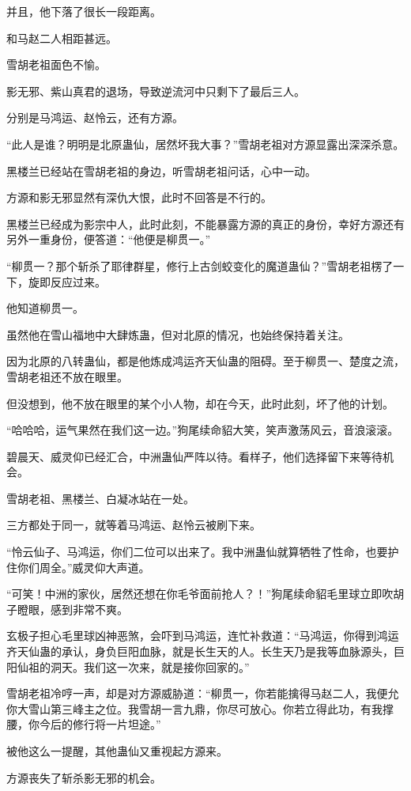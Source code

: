 \begin{this_body}
并且，他下落了很长一段距离。

和马赵二人相距甚远。

雪胡老祖面色不愉。

影无邪、紫山真君的退场，导致逆流河中只剩下了最后三人。

分别是马鸿运、赵怜云，还有方源。

“此人是谁？明明是北原蛊仙，居然坏我大事？”雪胡老祖对方源显露出深深杀意。

黑楼兰已经站在雪胡老祖的身边，听雪胡老祖问话，心中一动。

方源和影无邪显然有深仇大恨，此时不回答是不行的。

黑楼兰已经成为影宗中人，此时此刻，不能暴露方源的真正的身份，幸好方源还有另外一重身份，便答道：“他便是柳贯一。”

“柳贯一？那个斩杀了耶律群星，修行上古剑蛟变化的魔道蛊仙？”雪胡老祖楞了一下，旋即反应过来。

他知道柳贯一。

虽然他在雪山福地中大肆炼蛊，但对北原的情况，也始终保持着关注。

因为北原的八转蛊仙，都是他炼成鸿运齐天仙蛊的阻碍。至于柳贯一、楚度之流，雪胡老祖还不放在眼里。

但没想到，他不放在眼里的某个小人物，却在今天，此时此刻，坏了他的计划。

“哈哈哈，运气果然在我们这一边。”狗尾续命貂大笑，笑声激荡风云，音浪滚滚。

碧晨天、威灵仰已经汇合，中洲蛊仙严阵以待。看样子，他们选择留下来等待机会。

雪胡老祖、黑楼兰、白凝冰站在一处。

三方都处于同一，就等着马鸿运、赵怜云被刷下来。

“怜云仙子、马鸿运，你们二位可以出来了。我中洲蛊仙就算牺牲了性命，也要护住你们周全。”威灵仰大声道。

“可笑！中洲的家伙，居然还想在你毛爷面前抢人？！”狗尾续命貂毛里球立即吹胡子瞪眼，感到非常不爽。

玄极子担心毛里球凶神恶煞，会吓到马鸿运，连忙补救道：“马鸿运，你得到鸿运齐天仙蛊的承认，身负巨阳血脉，就是长生天的人。长生天乃是我等血脉源头，巨阳仙祖的洞天。我们这一次来，就是接你回家的。”

雪胡老祖冷哼一声，却是对方源威胁道：“柳贯一，你若能擒得马赵二人，我便允你大雪山第三峰主之位。我雪胡一言九鼎，你尽可放心。你若立得此功，有我撑腰，你今后的修行将一片坦途。”

被他这么一提醒，其他蛊仙又重视起方源来。

方源丧失了斩杀影无邪的机会。


\end{this_body}

